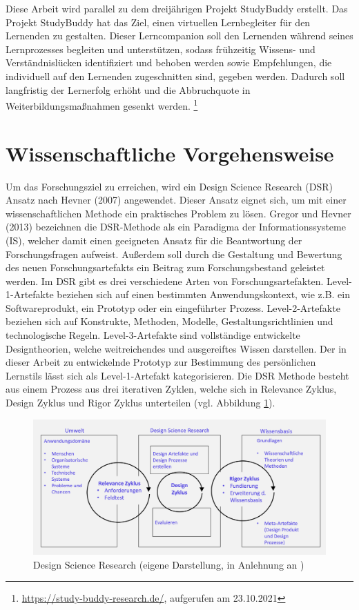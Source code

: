 Diese Arbeit wird parallel zu dem dreijährigen Projekt StudyBuddy erstellt. Das Projekt StudyBuddy hat das Ziel, einen virtuellen Lernbegleiter für den Lernenden zu gestalten.
Dieser Lerncompanion soll den Lernenden während seines Lernprozesses begleiten und unterstützen, sodass frühzeitig Wissens- und Verständnislücken identifiziert und behoben werden
sowie Empfehlungen, die individuell auf den Lernenden zugeschnitten sind, gegeben werden. Dadurch soll langfristig der Lernerfolg erhöht und die Abbruchquote in Weiterbildungsmaßnahmen gesenkt werden. \footnote{\url{https://study-buddy-research.de/}, aufgerufen am 23.10.2021}

\section{Wissenschaftliche Vorgehensweise} \label{Vorgehensweise}
Um das Forschungsziel zu erreichen, wird ein Design Science Research (DSR) Ansatz 
nach Hevner (2007) angewendet. Dieser Ansatz eignet sich, um mit 
einer wissenschaftlichen Methode ein praktisches Problem zu lösen. \parencite[91]{Hevner.2007}
Gregor und Hevner (2013) bezeichnen die DSR-Methode als ein Paradigma der Informationssysteme (IS),
welcher damit einen geeigneten Ansatz für die Beantwortung der Forschungsfragen aufweist. \parencite[337]{Gregor.2013}
Außerdem 
soll durch die Gestaltung und Bewertung des neuen Forschungsartefakts 
ein Beitrag zum Forschungsbestand geleistet werden.
Im DSR gibt es drei verschiedene Arten von Forschungsartefakten.
Level-1-Artefakte beziehen sich auf einen bestimmten Anwendungskontext, wie 
z.B. ein Softwareprodukt, ein Prototyp oder ein eingeführter Prozess. 
Level-2-Artefakte beziehen sich auf Konstrukte, Methoden, Modelle, Gestaltungsrichtlinien
und technologische Regeln.
Level-3-Artefakte sind vollständige entwickelte Designtheorien, welche weitreichendes und 
ausgereiftes Wissen darstellen.  \parencite[342]{Gregor.2013}
Der in dieser Arbeit zu entwickelnde Prototyp zur Bestimmung des persönlichen Lernstils lässt sich als Level-1-Artefakt kategorisieren.
Die DSR Methode besteht aus einem Prozess aus drei iterativen Zyklen, welche sich 
in Relevance Zyklus, Design Zyklus und Rigor Zyklus unterteilen (vgl. Abbildung \ref{fig:DSR}). \parencite[88]{Hevner.2007}
\begin{figure}[H]
    \centering
    \includegraphics[width=1\linewidth]{images/Hevner.png}
    \caption[Design Science Research]{Design Science Research (eigene Darstellung, in Anlehnung an \parencite[88]{Hevner.2007})}
    \label{fig:DSR}
\end{figure}

